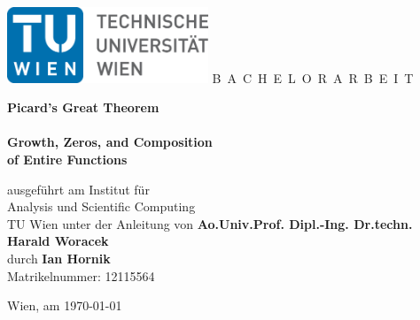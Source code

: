 \documentclass[a4paper,11pt,bibliography=totoc,listof=totoc,headinclude=true,cleardoublepage=empty,oneside]{scrbook}
\newcommand{\1}{\mathbbm{1}}
\theoremstyle{plain}
\theoremstyle{definition}
\begin{document}


\begin{titlepage}
  \begin{center}
    \includegraphics[width=0.45\textwidth]{TULogo.eps}
    \vskip 1cm%
    {\LARGE B~\Large A~C~H~E~L~O~R~A~R~B~E~I~T}
    \vskip 8mm
    {\huge\bfseries{} Picard's Great Theorem \\ \vspace{-0.1cm}{\Large and} \\ Growth, Zeros, and Composition \\ of Entire Functions \par}
    \vskip 1cm
    \large 
    ausgef\"uhrt am    
    \vskip 0.75cm
    {\Large Institut f\"ur\\[1ex] Analysis und Scientific Computing}\\[1ex]
    {\Large TU Wien}
    \vskip0.75cm
    unter der Anleitung von
    \vskip0.75cm
    {\Large\bfseries Ao.Univ.Prof. Dipl.-Ing. Dr.techn. Harald Woracek}\\[1ex]
    \vskip 0.5cm
    durch
    \vskip 0.5cm
    {\Large\bfseries Ian Hornik}\\[1ex]
    {Matrikelnummer: 12115564}\\[1ex]
  \end{center}
  
  \vfill
  
  \small
  Wien, am \today
  \vspace*{-15mm}
\end{titlepage}

\cleardoublepage


\tableofcontents

\cleardoublepage
{}





\end{document}
